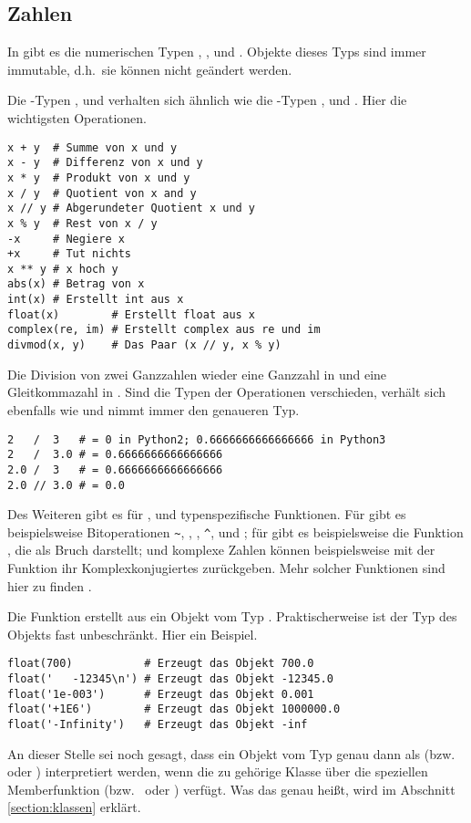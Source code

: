 \subsection{Zahlen}
\label{section:std_data_types:zahlen}
In \Python gibt es die numerischen Typen , ,  und .
Objekte dieses Typs sind immer immutable, d.h.\ sie können nicht geändert werden.

Die \Python-Typen ,  und  verhalten sich ähnlich wie die \CC-Typen ,  und .
Hier die wichtigsten Operationen.
\begin{lstlisting}
x + y  # Summe von x und y
x - y  # Differenz von x und y
x * y  # Produkt von x und y
x / y  # Quotient von x and y
x // y # Abgerundeter Quotient x und y
x % y  # Rest von x / y
-x     # Negiere x
+x     # Tut nichts
x ** y # x hoch y
abs(x) # Betrag von x
int(x) # Erstellt int aus x
float(x)        # Erstellt float aus x
complex(re, im) # Erstellt complex aus re und im
divmod(x, y)    # Das Paar (x // y, x % y)
\end{lstlisting}
Die Division von zwei Ganzzahlen wieder eine Ganzzahl in \PythonZwei und eine Gleitkommazahl in \PythonDrei.
Sind die Typen der Operationen verschieden, verhält sich \Python ebenfalls wie \CC und nimmt immer den genaueren Typ.
\begin{lstlisting}
2   /  3   # = 0 in Python2; 0.6666666666666666 in Python3
2   /  3.0 # = 0.6666666666666666
2.0 /  3   # = 0.6666666666666666
2.0 // 3.0 # = 0.0
\end{lstlisting}

Des Weiteren gibt es für ,  und  typenspezifische Funktionen.
Für  gibt es beispielsweise Bitoperationen \lstinline[style=PyInline]|~|, \lpy{|}, \lpy{&}, \lstinline[style=PyInline]|^|, \lpy{<<} und \lpy{>>};
für  gibt es beispielsweise die Funktion , die  als Bruch darstellt;
und komplexe Zahlen können beispielsweise mit der Funktion  ihr Komplexkonjugiertes zurückgeben.
Mehr solcher Funktionen sind hier zu finden \cite[Library, Build-in Types, Numeric Types]{Python3}.

Die Funktion  erstellt aus  ein Objekt vom Typ .
Praktischerweise ist der Typ des Objekts  fast unbeschränkt.
Hier ein Beispiel.
\begin{lstlisting}
float(700)           # Erzeugt das Objekt 700.0
float('   -12345\n') # Erzeugt das Objekt -12345.0
float('1e-003')      # Erzeugt das Objekt 0.001
float('+1E6')        # Erzeugt das Objekt 1000000.0
float('-Infinity')   # Erzeugt das Objekt -inf
\end{lstlisting}
An dieser Stelle sei noch gesagt, dass ein Objekt vom Typ  genau dann als  (bzw.\  oder ) interpretiert werden,
wenn die zu  gehörige Klasse über die speziellen Memberfunktion  (bzw.\  oder ) verfügt.
Was das genau heißt, wird im Abschnitt \ref{section:klassen} erklärt.
